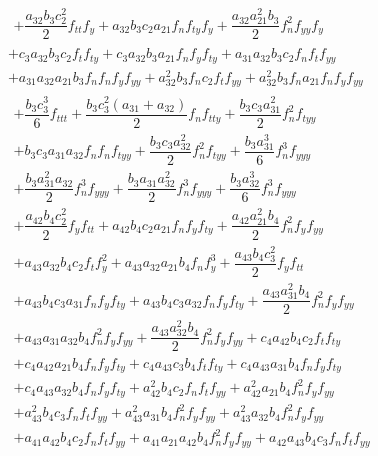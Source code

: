 \documentclass[a4paper,oneside]{book}
\numberwithin{equation}{chapter}
\begin{document}
\begin{align}
{\begin{array}{*{20}{l}}
\begin{array}{l}
 + \dfrac{{{a_{32}}{b_3}c_2^2}}{2}{f_{tt}}{f_y} + {a_{32}}{b_3}{c_2}{a_{21}}{f_n}{f_{ty}}{f_y} + \dfrac{{{a_{32}}a_{21}^2{b_3}}}{2}f_n^2{f_{yy}}{f_y}
\end{array}\\
{ + {c_3}{a_{32}}{b_3}{c_2}{f_t}{f_{ty}} + {c_3}{a_{32}}{b_3}{a_{21}}{f_n}{f_y}{f_{ty}} + {a_{31}}{a_{32}}{b_3}{c_2}{f_n}{f_t}{f_{yy}}}\\
{ + {a_{31}}{a_{32}}{a_{21}}{b_3}{f_n}{f_n}{f_y}{f_{yy}} + a_{32}^2{b_3}{f_n}{c_2}{f_t}{f_{yy}} + a_{32}^2{b_3}{f_n}{a_{21}}{f_n}{f_y}{f_{yy}}}\\
\begin{array}{l}
 + \dfrac{{{b_3}c_3^3}}{6}{f_{ttt}} + \dfrac{{{b_3}c_3^2\left( {{a_{31}} + {a_{32}}} \right)}}{2}{f_n}{f_{tty}} + \dfrac{{{b_3}{c_3}a_{31}^2}}{2}f_n^2{f_{tyy}}\\
+ {b_3}{c_3}{a_{31}}{a_{32}}{f_n}{f_n}{f_{tyy}} + \dfrac{{{b_3}{c_3}a_{32}^2}}{2}f_n^2{f_{tyy}} + \dfrac{{{b_3}a_{31}^3}}{6}f_n^3{f_{yyy}}\\
 + \dfrac{{{b_3}a_{31}^2{a_{32}}}}{2}f_n^3{f_{yyy}} + \dfrac{{{b_3}{a_{31}}a_{32}^2}}{2}f_n^3{f_{yyy}} + \dfrac{{{b_3}a_{32}^3}}{6}f_n^3{f_{yyy}}\\
 + \dfrac{{{a_{42}}{b_4}c_2^2}}{2}{f_y}{f_{tt}} + {a_{42}}{b_4}{c_2}{a_{21}}{f_n}{f_y}{f_{ty}} + \dfrac{{{a_{42}}a_{21}^2{b_4}}}{2}f_n^2{f_y}{f_{yy}}\\
 + {a_{43}}{a_{32}}{b_4}{c_2}{f_t}f_y^2 + {a_{43}}{a_{32}}{a_{21}}{b_4}{f_n}f_y^3 + \dfrac{{{a_{43}}{b_4}c_3^2}}{2}{f_y}{f_{tt}}\\
 + {a_{43}}{b_4}{c_3}{a_{31}}{f_n}{f_y}{f_{ty}} + {a_{43}}{b_4}{c_3}{a_{32}}{f_n}{f_y}{f_{ty}} + \dfrac{{{a_{43}}a_{31}^2{b_4}}}{2}f_n^2{f_y}{f_{yy}}\\
 + {a_{43}}{a_{31}}{a_{32}}{b_4}f_n^2{f_y}{f_{yy}} + \dfrac{{{a_{43}}a_{32}^2{b_4}}}{2}f_n^2{f_y}{f_{yy}} + {c_4}{a_{42}}{b_4}{c_2}{f_t}{f_{ty}}\\
  + {c_4}{a_{42}}{a_{21}}{b_4}{f_n}{f_y}{f_{ty}} + {c_4}{a_{43}}{c_3}{b_4}{f_t}{f_{ty}} + {c_4}{a_{43}}{a_{31}}{b_4}{f_n}{f_y}{f_{ty}}\\
 + {c_4}{a_{43}}{a_{32}}{b_4}{f_n}{f_y}{f_{ty}} + a_{42}^2{b_4}{c_2}{f_n}{f_t}{f_{yy}} + a_{42}^2{a_{21}}{b_4}f_n^2{f_y}{f_{yy}}\\
 + a_{43}^2{b_4}{c_3}{f_n}{f_t}{f_{yy}} + a_{43}^2{a_{31}}{b_4}f_n^2{f_y}{f_{yy}} + a_{43}^2{a_{32}}{b_4}f_n^2{f_y}{f_{yy}}\\
 + {a_{41}}{a_{42}}{b_4}{c_2}{f_n}{f_t}{f_{yy}} + {a_{41}}{a_{21}}{a_{42}}{b_4}f_n^2{f_y}{f_{yy}} + {a_{42}}{a_{43}}{b_4}{c_3}{f_n}{f_t}{f_{yy}}\\

\end{array}
\end{array}}
\end{align}
\end{document}
